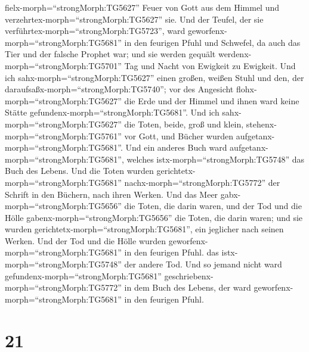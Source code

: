fielx-morph=``strongMorph:TG5627'' Feuer von Gott aus dem Himmel und
verzehrtex-morph=``strongMorph:TG5627'' sie.  Und der
Teufel, der sie verführtex-morph=``strongMorph:TG5723'', ward
geworfenx-morph=``strongMorph:TG5681'' in den feurigen Pfuhl und
Schwefel, da auch das Tier und der falsche Prophet war; und sie werden
gequält werdenx-morph=``strongMorph:TG5701'' Tag und Nacht von Ewigkeit
zu Ewigkeit.  Und ich sahx-morph=``strongMorph:TG5627''
einen großen, weißen Stuhl und den, der
daraufsaßx-morph=``strongMorph:TG5740''; vor des Angesicht
flohx-morph=``strongMorph:TG5627'' die Erde und der Himmel und ihnen
ward keine Stätte gefundenx-morph=``strongMorph:TG5681''. 
Und ich sahx-morph=``strongMorph:TG5627'' die Toten, beide, groß und
klein, stehenx-morph=``strongMorph:TG5761'' vor Gott, und Bücher wurden
aufgetanx-morph=``strongMorph:TG5681''. Und ein anderes Buch ward
aufgetanx-morph=``strongMorph:TG5681'', welches
istx-morph=``strongMorph:TG5748'' das Buch des Lebens. Und die Toten
wurden gerichtetx-morph=``strongMorph:TG5681''
nachx-morph=``strongMorph:TG5772'' der Schrift in den Büchern, nach
ihren Werken.  Und das Meer
gabx-morph=``strongMorph:TG5656'' die Toten, die darin waren, und der
Tod und die Hölle gabenx-morph=``strongMorph:TG5656'' die Toten, die
darin waren; und sie wurden gerichtetx-morph=``strongMorph:TG5681'', ein
jeglicher nach seinen Werken.  Und der Tod und die Hölle
wurden geworfenx-morph=``strongMorph:TG5681'' in den feurigen Pfuhl. das
istx-morph=``strongMorph:TG5748'' der andere Tod.  Und so
jemand nicht ward gefundenx-morph=``strongMorph:TG5681''
geschriebenx-morph=``strongMorph:TG5772'' in dem Buch des Lebens, der
ward geworfenx-morph=``strongMorph:TG5681'' in den feurigen Pfuhl.

\hypertarget{section-20}{%
\section{21}\label{section-20}}

